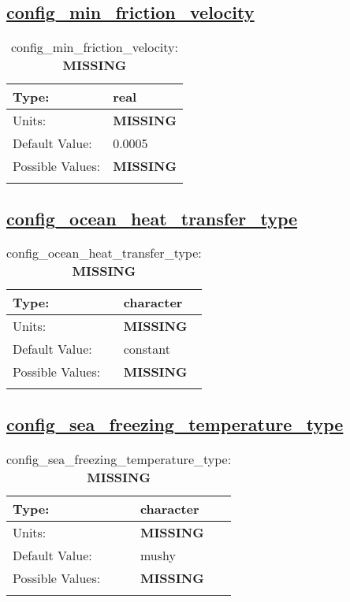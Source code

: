 \subsection[config\_min\_friction\_velocity]{\hyperref[sec:nm_tab_ocean]{config\_min\_friction\_velocity}}
\label{subsec:nm_sec_config_min_friction_velocity}
\begin{center}
\begin{longtable}{| p{2.0in} || p{4.0in} |}
    \hline
    Type: & real \\
    \hline
    Units: & {\bf \color{red} MISSING} \\
    \hline
    Default Value: & 0.0005 \\
    \hline
    Possible Values: & {\bf \color{red} MISSING} \\
    \hline
    \caption{config\_min\_friction\_velocity: {\bf \color{red} MISSING}}
\end{longtable}
\end{center}
\subsection[config\_ocean\_heat\_transfer\_type]{\hyperref[sec:nm_tab_ocean]{config\_ocean\_heat\_transfer\_type}}
\label{subsec:nm_sec_config_ocean_heat_transfer_type}
\begin{center}
\begin{longtable}{| p{2.0in} || p{4.0in} |}
    \hline
    Type: & character \\
    \hline
    Units: & {\bf \color{red} MISSING} \\
    \hline
    Default Value: & constant \\
    \hline
    Possible Values: & {\bf \color{red} MISSING} \\
    \hline
    \caption{config\_ocean\_heat\_transfer\_type: {\bf \color{red} MISSING}}
\end{longtable}
\end{center}
\subsection[config\_sea\_freezing\_temperature\_type]{\hyperref[sec:nm_tab_ocean]{config\_sea\_freezing\_temperature\_type}}
\label{subsec:nm_sec_config_sea_freezing_temperature_type}
\begin{center}
\begin{longtable}{| p{2.0in} || p{4.0in} |}
    \hline
    Type: & character \\
    \hline
    Units: & {\bf \color{red} MISSING} \\
    \hline
    Default Value: & mushy \\
    \hline
    Possible Values: & {\bf \color{red} MISSING} \\
    \hline
    \caption{config\_sea\_freezing\_temperature\_type: {\bf \color{red} MISSING}}
\end{longtable}
\end{center}
